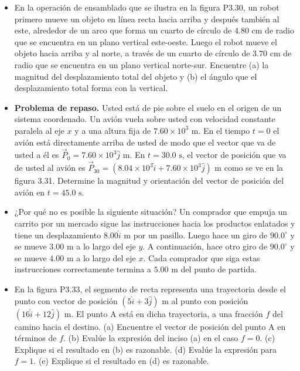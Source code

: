 \documentclass[11pt,a4paper]{article}
\begin{document}
\begin{itemize}
    \item[\textbf{30.}] En la operación de ensamblado que se ilustra en la figura P3.30, un robot primero mueve un objeto en línea recta hacia arriba y después también al este, alrededor de un arco que forma un cuarto de círculo de $4.80 \text{ cm}$ de radio que se encuentra en un plano vertical este-oeste. Luego el robot mueve el objeto hacia arriba y al norte, a través de un cuarto de círculo de $3.70 \text{ cm}$ de radio que se encuentra en un plano vertical norte-sur. Encuentre (a) la magnitud del desplazamiento total del objeto y (b) el ángulo que el desplazamiento total forma con la vertical.
    \vspace*{6cm}

    \item[\textbf{31.}] \textbf{Problema de repaso.} Usted está de pie sobre el suelo en el origen de un sistema coordenado. Un avión vuela sobre usted con velocidad constante paralela al eje $x$ y a una altura fija de $7.60 \times 10^3 \text{ m}$. En el tiempo $t = 0$ el avión está directamente arriba de usted de modo que el vector que va de usted a él es $\vec{P}_0 = 7.60 \times 10^3\hat{j} \text{ m}$. En $t = 30.0 \text{ s}$, el vector de posición que va de usted al avión es $\vec{P}_{30} = (8.04 \times 10^3\hat{i} + 7.60 \times 10^3\hat{j}) \text{ m}$ como se ve en la figura 3.31. Determine la magnitud y orientación del vector de posición del avión en $t = 45.0 \text{ s}$.
    \vspace*{6cm}

    \item[\textbf{32.}] ¿Por qué no es posible la siguiente situación? Un comprador que empuja un carrito por un mercado sigue las instrucciones hacia los productos enlatados y tiene un desplazamiento $8.00\hat{i} \text{ m}$ por un pasillo. Luego hace un giro de $90.0^\circ$ y se mueve $3.00 \text{ m}$ a lo largo del eje $y$. A continuación, hace otro giro de $90.0^\circ$ y se mueve $4.00 \text{ m}$ a lo largo del eje $x$. Cada comprador que siga estas instrucciones correctamente termina a $5.00 \text{ m}$ del punto de partida.
    \vspace*{6cm}

    \item[\textbf{33.}] En la figura P3.33, el segmento de recta representa una trayectoria desde el punto con vector de posición $(5\hat{i} + 3\hat{j}) \text{ m}$ al punto con posición $(16\hat{i} + 12\hat{j}) \text{ m}$. El punto A está en dicha trayectoria, a una fracción $f$ del camino hacia el destino. (a) Encuentre el vector de posición del punto A en términos de $f$. (b) Evalúe la expresión del inciso (a) en el caso $f = 0$. (c) Explique si el resultado en (b) es razonable. (d) Evalúe la expresión para $f = 1$. (e) Explique si el resultado en (d) es razonable.
    \vspace*{8cm}
\end{itemize}
\end{document}
